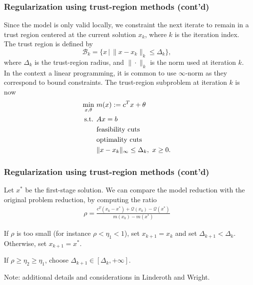 \documentclass{beamer}
\def\cB{\mathcal{B}}
\def\cQ{\mathcal{Q}}
\begin{document}
\begin{frame}
\frametitle{Regularization using trust-region methods (cont'd)}

Since the model is only valid locally, we constraint the next iterate to remain in a trust region centered at the current solution $x_k$, where $k$ is the iteration index.
The trust region is defined by
$$
\cB_k = \{ x \,|\, \| x-x_k \|_k \leq \Delta_k \},
$$
where $\Delta_k$ is the trust-region radius, and $\|\cdot\|_k$ is the norm used at iteration $k$.
In the context a linear programming, it is common to use $\infty$-norm as they correspond to bound constraints.
The trust-region subproblem at iteration $k$ is now
\begin{align*}
\min_{x,\theta} \ & m(x) := c^T x + \theta \\
\mbox{s.t. } & Ax = b \\
& {\rm feasibility\ cuts} \\
& {\rm optimality\ cuts} \\
& \|x-x_k\|_{\infty} \leq \Delta_k,\ x \geq 0.
\end{align*}
\end{frame}

\begin{frame}
\frametitle{Regularization using trust-region methods (cont'd)}

Let $x^*$ be the first-stage solution.
We can compare the model reduction with the original problem reduction, by computing the ratio
\begin{align*}
\rho = \frac{c^T(x_k-x^*)+\cQ(x_k)-\cQ(x^*)}{m(x_k)-m(x^*)}
\end{align*}

\mbox{}

If $\rho$ is too small (for instance $\rho < \eta_1 < 1$), set $x_{k+1} = x_k$ and set $\Delta_{k+1} < \Delta_k$.
Otherwise, set $x_{k+1} = x^*$.\\

\mbox{}

If $\rho \geq \eta_2 \geq \eta_1$, choose $\Delta_{k+1} \in [\Delta_k, +\infty]$.

\mbox{}

Note: additional details and considerations in Linderoth and Wright.

\end{frame}
\end{document}
